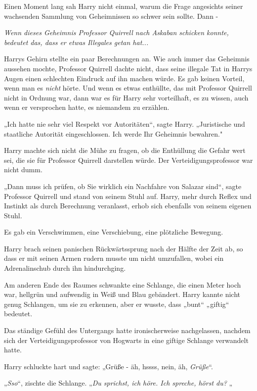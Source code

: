{Einen Moment lang sah Harry nicht einmal, warum die Frage angesichts seiner wachsenden Sammlung von Geheimnissen so schwer sein sollte. Dann -

\emph{Wenn dieses Geheimnis Professor Quirrell nach Askaban schicken konnte, bedeutet das, dass er etwas Illegales getan hat...}

Harrys Gehirn stellte ein paar Berechnungen an. Wie auch immer das Geheimnis aussehen mochte, Professor Quirrell dachte nicht, dass seine illegale Tat in Harrys Augen einen schlechten Eindruck auf ihn machen würde. Es gab keinen Vorteil, wenn man es \emph{nicht} hörte. Und wenn es etwas enthüllte, das mit Professor Quirrell nicht in Ordnung war, dann war es für Harry sehr vorteilhaft, es zu wissen, auch wenn er versprochen hatte, es niemandem zu erzählen.

„Ich hatte nie sehr viel Respekt vor Autoritäten“, sagte Harry. „Juristische und staatliche Autorität eingeschlossen. Ich werde Ihr Geheimnis bewahren."

Harry machte sich nicht die Mühe zu fragen, ob die Enthüllung die Gefahr wert sei, die sie für Professor Quirrell darstellen würde. Der Verteidigungsprofessor war nicht dumm.

„Dann muss ich prüfen, ob Sie wirklich ein Nachfahre von Salazar sind“, sagte Professor Quirrell und stand von seinem Stuhl auf. Harry, mehr durch Reflex und Instinkt als durch Berechnung veranlasst, erhob sich ebenfalls von seinem eigenen Stuhl.

Es gab ein Verschwimmen, eine Verschiebung, eine plötzliche Bewegung.

Harry brach seinen panischen Rückwärtssprung nach der Hälfte der Zeit ab, so dass er mit seinen Armen rudern musste um nicht umzufallen, wobei ein Adrenalinschub durch ihn hindurchging.

Am anderen Ende des Raumes schwankte eine Schlange, die einen Meter hoch war, hellgrün und aufwendig in Weiß und Blau gebändert. Harry kannte nicht genug Schlangen, um sie zu erkennen, aber er wusste, dass „bunt“ „giftig“ bedeutet.

Das ständige Gefühl des Untergangs hatte ironischerweise nachgelassen, nachdem sich der Verteidigungsprofessor von Hogwarts in eine giftige Schlange verwandelt hatte.

Harry schluckte hart und sagte: „Grüße - äh, hssss, nein, äh, \emph{Grüße}“.

„\emph{Sso}“, zischte die Schlange. „\emph{Du sprichst, ich höre. Ich spreche, hörst du?} „

}
